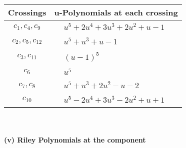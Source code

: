 \documentclass[1p]{elsarticle_modified}
\theoremstyle{definition}
\begin{document}
\begin{tabular}{m{50pt}|m{274pt}}
Crossings & \hspace{64pt}u-Polynomials at each crossing \\
\hline $$\begin{aligned}c_{1},c_{4},c_{9}\end{aligned}$$&$\begin{aligned}
&u^5+2 u^4+3 u^3+2 u^2+u-1
\end{aligned}$\\
\hline $$\begin{aligned}c_{2},c_{5},c_{12}\end{aligned}$$&$\begin{aligned}
&u^5+u^3+u-1
\end{aligned}$\\
\hline $$\begin{aligned}c_{3},c_{11}\end{aligned}$$&$\begin{aligned}
&(u-1)^5
\end{aligned}$\\
\hline $$\begin{aligned}c_{6}\end{aligned}$$&$\begin{aligned}
&u^5
\end{aligned}$\\
\hline $$\begin{aligned}c_{7},c_{8}\end{aligned}$$&$\begin{aligned}
&u^5+u^3+2 u^2- u-2
\end{aligned}$\\
\hline $$\begin{aligned}c_{10}\end{aligned}$$&$\begin{aligned}
&u^5-2 u^4+3 u^3-2 u^2+u+1
\end{aligned}$\\
\hline
\end{tabular}\\~\\
\newpage\renewcommand{\arraystretch}{1}
\flushleft \textbf{(v) Riley Polynomials at the component}\newline \\
\end{document}
